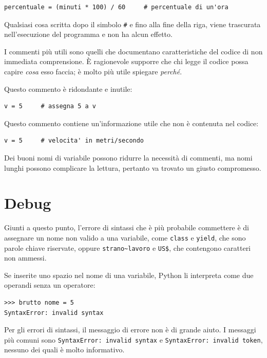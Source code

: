 \documentclass[10pt]{book}
\begin{document}
\begin{verbatim}
percentuale = (minuti * 100) / 60     # percentuale di un'ora
\end{verbatim}
%
Qualsiasi cosa scritta dopo il simbolo {\tt \#} e fino alla fine della riga, viene trascurata nell'esecuzione del programma e non ha alcun effetto. 

I commenti più utili sono quelli che documentano caratteristiche del codice di non immediata comprensione. È ragionevole supporre che chi legge il codice possa capire {\em cosa} esso faccia; è molto più utile spiegare {\em perché}.

Questo commento è ridondante e inutile:

\begin{verbatim}
v = 5     # assegna 5 a v
\end{verbatim}
%
Questo commento contiene un'informazione utile che non è contenuta nel codice:

\begin{verbatim}
v = 5     # velocita' in metri/secondo 
\end{verbatim}
%
Dei buoni nomi di variabile possono ridurre la necessità di commenti, ma nomi lunghi possono complicare la lettura, pertanto va trovato un giusto compromesso.


\section{Debug}

Giunti a questo punto, l'errore di sintassi che è più probabile commettere è di assegnare un nome non valido a una variabile, come {\tt class} e {\tt yield}, che sono parole chiave riservate, oppure \verb"strano~lavoro" e \verb"US$", che contengono caratteri non ammessi.

Se inserite uno spazio nel nome di una variabile, Python li interpreta come due operandi senza un operatore:

\begin{verbatim}
>>> brutto nome = 5
SyntaxError: invalid syntax
\end{verbatim}
%
Per gli errori di sintassi, il messaggio di errore non è di grande aiuto. I messaggi più comuni sono {\tt SyntaxError: invalid syntax} e
{\tt SyntaxError: invalid token}, nessuno dei quali è molto informativo.
\end{document}
